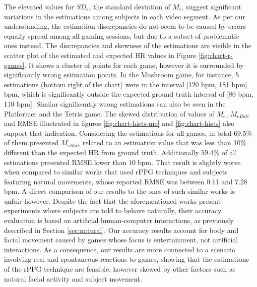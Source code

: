The elevated values for $SD_e$, the standard deviation of $M_e$, suggest significant variations in the estimations among subjects in each video segment. As per our understanding, the estimation discrepancies do not seem to be caused by errors equally spread among all gaming sessions, but due to a subset of problematic ones instead. The discrepancies and skewness of the estimations are visible in the scatter plot of the estimated and expected HR values in Figure \ref{fig:chart-r-games}. It shows a cluster of points for each game, however it is surrounded by significantly wrong estimation points. In the Mushroom game, for instance, 5 estimations (bottom right of the chart) were in the interval [120 bpm, 181 bpm] bpm, which is significantly outside the expected ground truth interval of [80 bpm, 110 bpm]. Similar significantly wrong estimations can also be seen in the Platformer and the Tetris game. The skewed distribution of values of $M_e$, $M_{eRate}$ and RMSE illustrated in figures \ref{fig:chart-hists-me} and \ref{fig:chart-hists} also support that indication. Considering the estimations for all games, in total 69.5\% of them presented $M_{eRate}$ related to an estimation value that was less than 10\% different than the expected HR from ground truth. Additionally 59.4\% of all estimations presented RMSE lower than 10 bpm. That result is slightly worse when compared to similar works that used rPPG techniques and subjects featuring natural movements, whose reported RMSE was between 0.11 and 7.28 bpm. A direct comparison of our results to the ones of such similar works is unfair however. Despite the fact that the aforementioned works present experiments where subjects are told to behave naturally, their accuracy evaluation is based on artificial human-computer interactions, as previously described in Section \ref{sec:natural}. Our accuracy results account for body and facial movement caused by games whose focus is entertainment, not artificial interactions. As a consequence, our results are more connected to a scenario involving real and spontaneous reactions to games, showing that the estimations of the rPPG technique are feasible, however skewed by other factors such as natural facial activity and subject movement.

